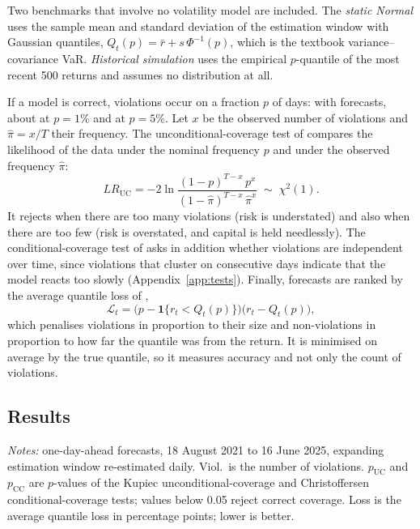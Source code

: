 \documentclass[11pt,a4paper]{article}
\newcommand{\ind}{\mathbf{1}}
\newcommand{\tabnote}[1]{\par\vspace{5pt}\begin{minipage}{\linewidth}\setstretch{1.0}\footnotesize\textit{Notes:} #1\end{minipage}}
\begin{document}
Two benchmarks that involve no volatility model are included. The \emph{static Normal} uses the sample mean and standard deviation of the estimation window with Gaussian quantiles, $Q_t(p)=\bar r+s\,\Phi^{-1}(p)$, which is the textbook variance--covariance VaR. \emph{Historical simulation} uses the empirical $p$-quantile of the most recent 500 returns and assumes no distribution at all.

If a model is correct, violations occur on a fraction $p$ of days: with \oosN{} forecasts, about \oosExpOne{} at $p=1\%$ and \oosExpFive{} at $p=5\%$. Let $x$ be the observed number of violations and $\hat\pi=x/T$ their frequency. The unconditional-coverage test of \citet{kupiec1995} compares the likelihood of the data under the nominal frequency $p$ and under the observed frequency $\hat\pi$:
\begin{equation}
LR_{\mathrm{UC}}=-2\ln\frac{(1-p)^{T-x}\,p^{x}}{(1-\hat\pi)^{T-x}\,\hat\pi^{x}}\;\sim\;\chi^2(1).
\end{equation}
It rejects when there are too many violations (risk is understated) and also when there are too few (risk is overstated, and capital is held needlessly). The conditional-coverage test of \citet{christoffersen1998} asks in addition whether violations are independent over time, since violations that cluster on consecutive days indicate that the model reacts too slowly (Appendix~\ref{app:tests}). Finally, forecasts are ranked by the average quantile loss of \citet{koenkerbassett1978},
\begin{equation}
\mathcal{L}_t=\bigl(p-\ind\{r_t<Q_t(p)\}\bigr)\bigl(r_t-Q_t(p)\bigr),
\end{equation}
which penalises violations in proportion to their size and non-violations in proportion to how far the quantile was from the return. It is minimised on average by the true quantile, so it measures accuracy and not only the count of violations.

\subsection{Results}

\begin{table}[t]
\centering
\caption{Out-of-sample backtests of one-day Value-at-Risk}\label{tab:oos}
\small

\tabnote{\oosN{} one-day-ahead forecasts, 18 August 2021 to 16 June 2025, expanding estimation window re-estimated daily. Viol.\ is the number of violations. $p_{\mathrm{UC}}$ and $p_{\mathrm{CC}}$ are $p$-values of the Kupiec unconditional-coverage and Christoffersen conditional-coverage tests; values below 0.05 reject correct coverage. Loss is the average quantile loss in percentage points; lower is better.}
\end{table}
\end{document}
